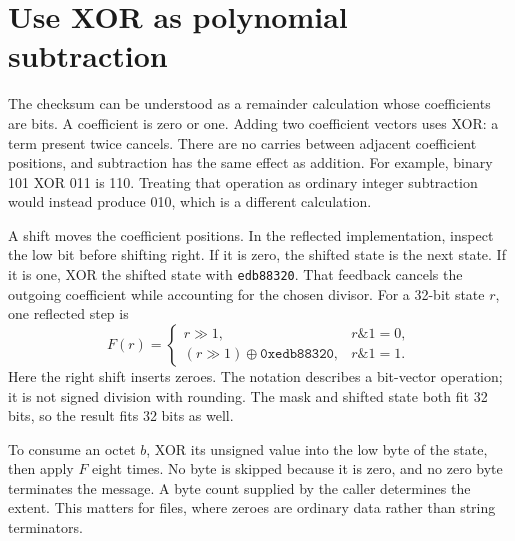 \section{Use XOR as polynomial subtraction}
The checksum can be understood as a remainder calculation whose coefficients are
bits. A coefficient is zero or one. Adding two coefficient vectors uses XOR: a term
present twice cancels. There are no carries between adjacent coefficient positions,
and subtraction has the same effect as addition. For example, binary 101 XOR 011 is
110. Treating that operation as ordinary integer subtraction would instead produce
010, which is a different calculation.

A shift moves the coefficient positions. In the reflected implementation, inspect
the low bit before shifting right. If it is zero, the shifted state is the next state.
If it is one, XOR the shifted state with \texttt{edb88320}. That feedback cancels
the outgoing coefficient while accounting for the chosen divisor. For a 32-bit state
\(r\), one reflected step is
\[
  F(r)=\begin{cases}
    r\mathbin{\gg}1,                                      & r\mathbin{\&}1=0, \\
    (r\mathbin{\gg}1)\mathbin{\oplus}\texttt{0xedb88320}, & r\mathbin{\&}1=1.
  \end{cases}
\]
Here the right shift inserts zeroes. The notation describes a bit-vector operation;
it is not signed division with rounding. The mask and shifted state both fit 32 bits,
so the result fits 32 bits as well.

To consume an octet \(b\), XOR its unsigned value into the low byte of the state,
then apply \(F\) eight times. No byte is skipped because it is zero, and no zero
byte terminates the message. A byte count supplied by the caller determines the extent.
This matters for files, where zeroes are ordinary data rather than string terminators.
